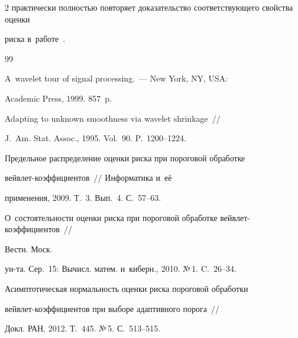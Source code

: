 \begin{multicols}{2}
практически пол\-ностью повторяет доказательство со\-от\-вет\-ст\-ву\-юще\-го свойства оцен\-ки 

рис\-ка в~работе~\cite{SH16}.



\vspace*{-9pt}



{\small\frenchspacing

 {%


 \begin{thebibliography}{99}


 A~wavelet tour of signal processing.~--- New York, NY, USA: 

Academic Press, 1999. 857~p.




 Adapting to unknown smoothness via wavelet shrinkage~// 

J.~Am. Stat. Assoc., 1995. Vol.~90. P.~1200--1224.




 Предельное распределение оценки рис\-ка при пороговой обработке 

вейв\-лет-ко\-эф\-фи\-ци\-ен\-тов~// Информатика и~её

применения, 2009. Т.~3. Вып.~4. С.~57--63.





О~со\-сто\-ятель\-ности оценки рис\-ка при пороговой обработке вейв\-лет-ко\-эф\-фи\-ци\-ен\-тов~// 

Вестн. Моск.

 ун-та. Сер.~15: Вычисл. матем. и~киберн., 2010. №\,1. C.~26--34.




 Асимптотическая нор\-маль\-ность оценки рис\-ка пороговой обработки 

вейв\-лет-ко\-эф\-фи\-ци\-ен\-тов при выборе адап\-тив\-но\-го порога~// 

Докл. РАН, 2012. Т.~445. №\,5. С.~513--515.




\end{thebibliography}}}
\end{multicols}
